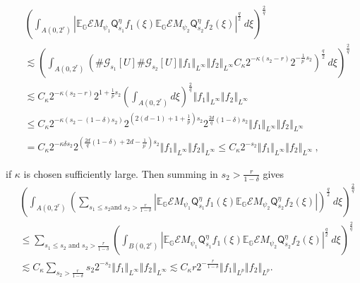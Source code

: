 \documentclass{amsart}%
\theoremstyle{plain}
\numberwithin{equation}{section}
\begin{document}
\begin{align*}
& \left(  \int_{A\left(  0,2^{r}\right)  }\left\vert \mathbb{E}_{\mathbb{G}%
}\mathcal{E}M_{\psi_{1}}\mathsf{Q}_{s_{1}}^{\eta}f_{1}\left(  \xi\right)
\mathbb{E}_{\mathbb{G}}\mathcal{E}M_{\psi_{2}}\mathsf{Q}_{s_{2}}^{\eta}%
f_{2}\left(  \xi\right)  \right\vert ^{\frac{q}{2}}\ d\xi\right)  ^{\frac
{2}{q}}\\
& \lesssim\left(  \int_{A\left(  0,2^{r}\right)  }\left(  \#\mathcal{G}%
_{s_{1}}\left[  U\right]  \#\mathcal{G}_{s_{2}}\left[  U\right]  \left\Vert
f_{1}\right\Vert _{L^{\infty}}\left\Vert f_{2}\right\Vert _{L^{\infty}%
}C_{\kappa}2^{-\kappa\left(  s_{2}-r\right)  }2^{-\frac{1}{p^{\prime}}s_{2}%
}\right)  ^{\frac{q}{2}}\ d\xi\right)  ^{\frac{2}{q}}\\
& \lesssim C_{\kappa}2^{-\kappa\left(  s_{2}-r\right)  }2^{1+\frac{1}{p}s_{2}%
}\left(  \int_{A\left(  0,2^{r}\right)  }d\xi\right)  ^{\frac{2}{q}}\left\Vert
f_{1}\right\Vert _{L^{\infty}}\left\Vert f_{2}\right\Vert _{L^{\infty}}\\
& \leq C_{\kappa}2^{-\kappa\left(  s_{2}-\left(  1-\delta\right)
s_{2}\right)  }2^{\left(  2\left(  d-1\right)  +1+\frac{1}{p}\right)  s_{2}%
}2^{\frac{2d}{q}\left(  1-\delta\right)  s_{2}}\left\Vert f_{1}\right\Vert
_{L^{\infty}}\left\Vert f_{2}\right\Vert _{L^{\infty}}\\
& =C_{\kappa}2^{-\kappa\delta s_{2}}2^{\left(  \frac{2d}{q}\left(
1-\delta\right)  +2d-\frac{1}{p^{\prime}}\right)  s_{2}}\left\Vert
f_{1}\right\Vert _{L^{\infty}}\left\Vert f_{2}\right\Vert _{L^{\infty}}\leq
C_{\kappa}2^{-s_{2}}\left\Vert f_{1}\right\Vert _{L^{\infty}}\left\Vert
f_{2}\right\Vert _{L^{\infty}}\ ,
\end{align*}


if $\kappa$ is chosen sufficiently large. Then summing in $s_{2}>\frac
{r}{1-\delta}$ gives
\begin{align}
& \left(  \int_{A\left(  0,2^{r}\right)  }\left(  \sum_{s_{1}\leq s_{2}\text{
and }s_{2}>\frac{r}{1-\delta}}\left\vert \mathbb{E}_{\mathbb{G}}%
\mathcal{E}M_{\psi_{1}}\mathsf{Q}_{s_{1}}^{\eta}f_{1}\left(  \xi\right)
\mathbb{E}_{\mathbb{G}}\mathcal{E}M_{\psi_{2}}\mathsf{Q}_{s_{2}}^{\eta}%
f_{2}\left(  \xi\right)  \right\vert \right)  ^{\frac{q}{2}}\ d\xi\right)
^{\frac{2}{q}}\label{first half}\\
& \leq\sum_{s_{1}\leq s_{2}\text{ and }s_{2}>\frac{r}{1-\delta}}\left(
\int_{B\left(  0,2^{r}\right)  }\left\vert \mathbb{E}_{\mathbb{G}}%
\mathcal{E}M_{\psi_{1}}\mathsf{Q}_{s_{1}}^{\eta}f_{1}\left(  \xi\right)
\mathbb{E}_{\mathbb{G}}\mathcal{E}M_{\psi_{2}}\mathsf{Q}_{s_{2}}^{\eta}%
f_{2}\left(  \xi\right)  \right\vert ^{\frac{q}{2}}\ d\xi\right)  ^{\frac
{2}{q}}\nonumber\\
& \lesssim C_{\kappa}\sum_{s_{2}>\frac{r}{1-\delta}}s_{2}2^{-s_{2}}\left\Vert
f_{1}\right\Vert _{L^{\infty}}\left\Vert f_{2}\right\Vert _{L^{\infty}%
}\lesssim C_{\kappa}r2^{-\frac{r}{1-\delta}}\left\Vert f_{1}\right\Vert
_{L^{p}}\left\Vert f_{2}\right\Vert _{L^{p}}.\nonumber
\end{align}
\end{document}
